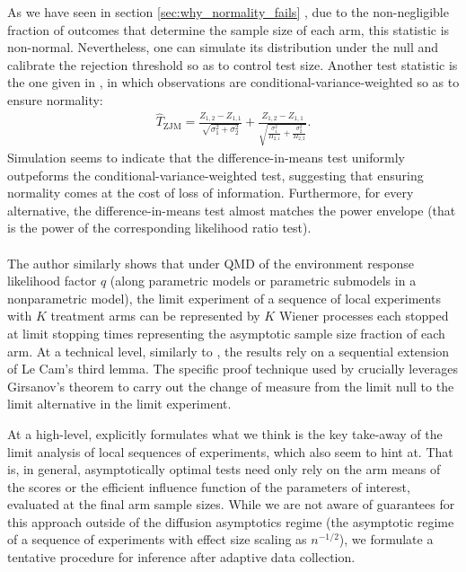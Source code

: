 As we have seen in section \ref{sec:why_normality_fails}    , due to the non-negligible fraction of outcomes that determine the sample size of each arm, this statistic is non-normal. Nevertheless, one can simulate its distribution under the null and calibrate the rejection threshold so as to control test size.
Another test statistic is the one given in \cite{zhang2000inference}, in which observations are conditional-variance-weighted so as to ensure normality:
\begin{align*}
    \hat{T}_{\mathrm{ZJM}} = \frac{Z_{1,2} - Z_{1,1}}{\sqrt{\sigma_1^2 + \sigma_2^2}} + \frac{Z_{1,2} - Z_{1,1}}{\sqrt{\frac{\sigma_1^2}{\Pi_{2,1}} + \frac{\sigma_2^2}{\Pi_{2,2}}}}.
\end{align*}
Simulation seems to indicate that the difference-in-means test uniformly outpeforms the conditional-variance-weighted test, suggesting that ensuring normality comes at the cost of loss of information. Furthermore, for every alternative, the difference-in-means test almost matches the power envelope (that is the power of the corresponding likelihood ratio test). 

\paragraph{\cite{adusumilli2023optimal}} The author similarly shows that under QMD of the environment response likelihood factor $q$ (along parametric models or parametric submodels in a nonparametric model), the limit experiment of a sequence of local experiments with $K$ treatment arms can be represented by $K$ Wiener processes each stopped at limit stopping times representing the asymptotic sample size fraction of each arm. At a technical level, similarly to \cite{hirano2023asymptotic}, the results rely on a sequential extension of Le Cam's third lemma. The specific proof technique used by \cite{adusumilli2023optimal} crucially leverages Girsanov's theorem to carry out the change of measure from the limit null to the limit alternative in the limit experiment. 

At a high-level, \cite{adusumilli2023optimal} explicitly formulates what we think is the key take-away of the limit analysis of local sequences of experiments, which \cite{hirano2023asymptotic} also seem to hint at. That is, in general, asymptotically optimal tests need only rely on the arm means of the scores or the efficient influence function of the parameters of interest, evaluated at the final arm sample sizes. While we are not aware of guarantees for this approach outside of the diffusion asymptotics regime (the asymptotic regime of a sequence of experiments with effect size scaling as $n^{-1/2}$), we formulate a tentative procedure for inference after adaptive data collection.

